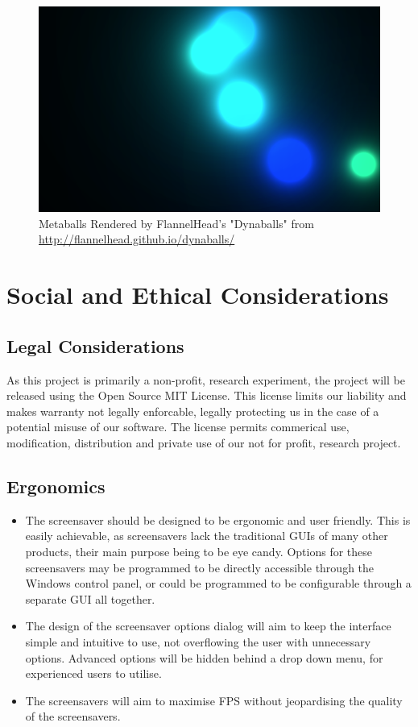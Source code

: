 \documentclass[10pt, openany]{book}
\begin{document}
\begin{figure}[H]
	\centering
	\includegraphics[width=.3\linewidth]{dynaballs}
	\caption[Metaballs Rendered by FlannelHead's "Dynaballs"]{Metaballs Rendered by FlannelHead's "Dynaballs" from \url{http://flannelhead.github.io/dynaballs/}}
\end{figure}	

\section{Social and Ethical Considerations}

\subsection{Legal Considerations}
As this project is primarily a non-profit, research experiment, the project will be released using the Open Source MIT License. This license limits our liability and makes warranty not legally enforcable, legally protecting us in the case of a potential misuse of our software. The license permits commerical use, modification, distribution and private use of our not for profit, research project.

\subsection{Ergonomics}
\begin{itemize}
	\item The screensaver should be designed to be ergonomic and user friendly. This is easily achievable, as screensavers lack the traditional GUIs of many other products, their main purpose being to be eye candy. Options for these screensavers may be programmed to be directly accessible through the Windows control panel, or could be programmed to be configurable through a separate GUI all together.
	\item The design of the screensaver options dialog will aim to keep the interface simple and intuitive to use, not overflowing the user with unnecessary options. Advanced options will be hidden behind a drop down menu, for experienced users to utilise.
	\item The screensavers will aim to maximise FPS without jeopardising the quality of the screensavers.	
\end{itemize}	
\end{document}
